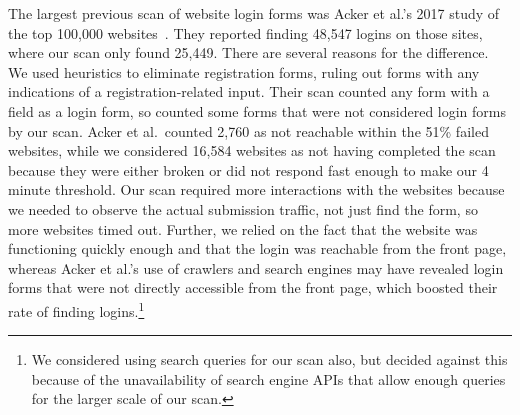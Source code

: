 The largest previous scan of website login forms %
was Acker et al.'s 2017 study of the top 100,000 websites~\cite{acker2017}. They reported finding 48,547 logins on those sites, where our scan only found 25,449. There are several 
reasons for the difference.  We used heuristics to eliminate registration forms, ruling out forms with any indications of a registration-related input.  Their scan counted any form with a  field as a login form, so counted some forms that were not considered login forms by our scan. Acker et al.\ counted 2,760 as not reachable within the 51\% failed websites, while we considered 16,584 websites as not having completed the scan because they were either broken or did not respond fast enough to make our 4 minute threshold. Our scan required more interactions with the websites because we needed to observe the actual submission traffic, not just find the form, so more websites timed out. %
Further, we relied on the fact that the website was functioning quickly enough and that the login was reachable from the front page, whereas Acker et al.'s use of crawlers and search engines may have revealed login forms that were not directly accessible from the front page, which boosted their rate of finding logins.\footnote{We considered using search queries for our scan also, but decided against this because of the unavailability of search engine APIs that allow enough queries for the larger scale of our scan.} 

